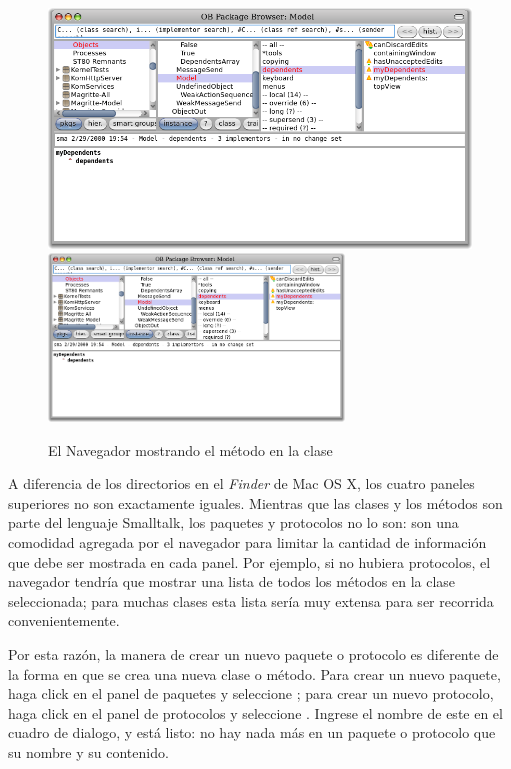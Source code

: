 \documentclass[a4paper,10pt,twoside]{book}
\begin{document}
\begin{figure}[htbp]
   \centering
   \ifluluelse
	   {\includegraphics[width=\textwidth]{SystemBrowserMyDependents}}
	   {\includegraphics[width=0.7\textwidth]{SystemBrowserMyDependents}}
   \caption{El Navegador mostrando el m\'etodo  en la clase 
   }
\end{figure}

A diferencia de los directorios en el \emph{Finder} de Mac OS X, los cuatro paneles superiores no son exactamente iguales.  
Mientras que las clases y los m\'etodos son parte del lenguaje Smalltalk, los paquetes y protocolos no lo son: son una comodidad agregada por el navegador para limitar la cantidad de informaci\'on que debe ser mostrada en cada panel. Por ejemplo, si no hubiera protocolos, el navegador tendr\'ia que mostrar una lista de todos los m\'etodos en la clase seleccionada; para muchas clases esta lista ser\'ia muy extensa para ser recorrida convenientemente.

Por esta raz\'on, la manera de crear un nuevo paquete o protocolo es diferente de la forma en que se crea una nueva clase o m\'etodo. Para crear un nuevo paquete, haga click en el panel de paquetes y seleccione ; para crear un nuevo protocolo, haga click en el panel de protocolos y seleccione .
Ingrese el nombre de este en el cuadro de dialogo, y est\'a listo: no hay nada m\'as en un paquete o protocolo que su nombre y su contenido.
\end{document}
